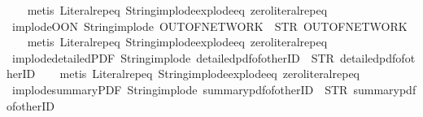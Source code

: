 \begin{isabellebody}
%
\isadelimproof
\ \ %
\endisadelimproof
%
\isatagproof
{}\isamarkupfalse%
\ {\isacharparenleft}metis\ Literal{\isachardot}rep{\isacharunderscore}eq\ String{\isachardot}implode{\isacharunderscore}explode{\isacharunderscore}eq\ zero{\isacharunderscore}literal{\isachardot}rep{\isacharunderscore}eq{\isacharparenright}%
\endisatagproof
{\isafoldproof}%
%
\isadelimproof
\isanewline
%
\endisadelimproof
\isanewline
{}\isamarkupfalse%
\ implode{\isacharunderscore}OON{\isacharcolon}\ {\isachardoublequoteopen}String{\isachardot}implode\ {\isacharprime}{\isacharprime}OUT{\isacharunderscore}OF{\isacharunderscore}NETWORK{\isacharprime}{\isacharprime}\ {\isacharequal}\ STR\ {\isacharprime}{\isacharprime}OUT{\isacharunderscore}OF{\isacharunderscore}NETWORK{\isacharprime}{\isacharprime}{\isachardoublequoteclose}\isanewline
%
\isadelimproof
\ \ %
\endisadelimproof
%
\isatagproof
{}\isamarkupfalse%
\ {\isacharparenleft}metis\ Literal{\isachardot}rep{\isacharunderscore}eq\ String{\isachardot}implode{\isacharunderscore}explode{\isacharunderscore}eq\ zero{\isacharunderscore}literal{\isachardot}rep{\isacharunderscore}eq{\isacharparenright}%
\endisatagproof
{\isafoldproof}%
%
\isadelimproof
\isanewline
%
\endisadelimproof
\isanewline
{}\isamarkupfalse%
\ implode{\isacharunderscore}detailedPDF{\isacharcolon}\ {\isachardoublequoteopen}String{\isachardot}implode\ {\isacharprime}{\isacharprime}detailed{\isacharunderscore}pdf{\isacharunderscore}of{\isacharunderscore}otherID{\isacharprime}{\isacharprime}\ {\isacharequal}\ STR\ {\isacharprime}{\isacharprime}detailed{\isacharunderscore}pdf{\isacharunderscore}of{\isacharunderscore}otherID{\isacharprime}{\isacharprime}{\isachardoublequoteclose}\isanewline
%
\isadelimproof
\ \ %
\endisadelimproof
%
\isatagproof
{}\isamarkupfalse%
\ {\isacharparenleft}metis\ Literal{\isachardot}rep{\isacharunderscore}eq\ String{\isachardot}implode{\isacharunderscore}explode{\isacharunderscore}eq\ zero{\isacharunderscore}literal{\isachardot}rep{\isacharunderscore}eq{\isacharparenright}%
\endisatagproof
{\isafoldproof}%
%
\isadelimproof
\isanewline
%
\endisadelimproof
\isanewline
{}\isamarkupfalse%
\ implode{\isacharunderscore}summaryPDF{\isacharcolon}\ {\isachardoublequoteopen}String{\isachardot}implode\ {\isacharprime}{\isacharprime}summary{\isacharunderscore}pdf{\isacharunderscore}of{\isacharunderscore}otherID{\isacharprime}{\isacharprime}\ {\isacharequal}\ STR\ {\isacharprime}{\isacharprime}summary{\isacharunderscore}pdf{\isacharunderscore}of{\isacharunderscore}otherID{\isacharprime}{\isacharprime}{\isachardoublequoteclose}\isanewline

\end{isabellebody}
